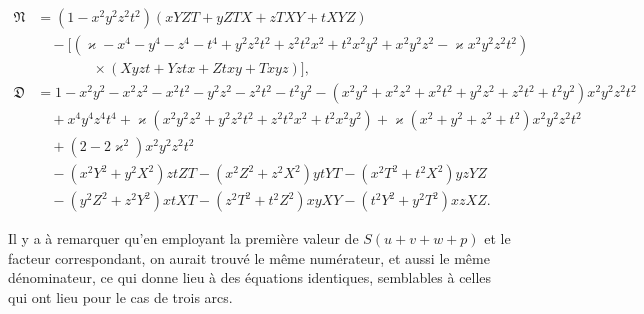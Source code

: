 \documentclass[11pt]{article}
\begin{document}
\[
\begin{aligned}
\mathfrak{N} &= (1 - x^{2}y^{2}z^{2}t^{2})(xYZT + yZTX + zTXY + tXYZ)\\
&\quad - \bigl[(\varkappa - x^{4} - y^{4} - z^{4} - t^{4} + y^{2}z^{2}t^{2} + z^{2}t^{2}x^{2} + t^{2}x^{2}y^{2} + x^{2}y^{2}z^{2} - \varkappa x^{2}y^{2}z^{2}t^{2})\\
&\qquad\qquad \times (Xyzt + Yztx + Ztxy + Txyz)\bigr],
\end{aligned}
\]
\[
\begin{aligned}
\mathfrak{D} &= 1 - x^{2}y^{2} - x^{2}z^{2} - x^{2}t^{2} - y^{2}z^{2} - z^{2}t^{2} - t^{2}y^{2} - (x^{2}y^{2} + x^{2}z^{2} + x^{2}t^{2} + y^{2}z^{2} + z^{2}t^{2} + t^{2}y^{2})x^{2}y^{2}z^{2}t^{2}\\
&\quad + x^{4}y^{4}z^{4}t^{4} + \varkappa(x^{2}y^{2}z^{2} + y^{2}z^{2}t^{2} + z^{2}t^{2}x^{2} + t^{2}x^{2}y^{2}) + \varkappa(x^{2} + y^{2} + z^{2} + t^{2})x^{2}y^{2}z^{2}t^{2}\\
&\quad + (2 - 2\varkappa^{2})x^{2}y^{2}z^{2}t^{2}\\
&\quad - (x^{2}Y^{2} + y^{2}X^{2})ztZT - (x^{2}Z^{2} + z^{2}X^{2})ytYT - (x^{2}T^{2} + t^{2}X^{2})yzYZ\\
&\quad - (y^{2}Z^{2} + z^{2}Y^{2})xtXT - (z^{2}T^{2} + t^{2}Z^{2})xyXY - (t^{2}Y^{2} + y^{2}T^{2})xzXZ.
\end{aligned}
\]

Il y a \`a remarquer qu'en employant la premi\`ere valeur de $S(u + v + w + p)$ et le facteur correspondant, on aurait trouv\'e le m\^eme num\'erateur, et aussi le m\^eme d\'enominateur, ce qui donne lieu \`a des \'equations identiques, semblables \`a celles qui ont lieu pour le cas de trois arcs.

\bigskip
\end{document}
